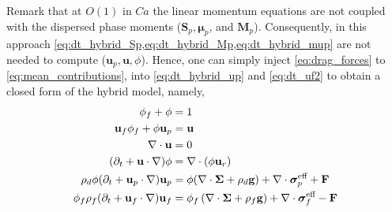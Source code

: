 Remark that at $O(1)$ in $Ca$ the linear momentum equations are not coupled with the dispersed phase moments ($\textbf{S}_p,\bm\mu_p$, and $\textbf{M}_p$).  
Consequently, in this approach \ref{eq:dt_hybrid_Sp,eq:dt_hybrid_Mp,eq:dt_hybrid_mup} are not needed to compute ($\textbf{u}_p,\textbf{u},\phi$).
Hence, one can simply inject \ref{eq:drag_forces} to \ref{eq:mean_contributions}, into  \ref{eq:dt_hybrid_up} and \ref{eq:dt_uf2} to obtain a closed form of the hybrid model, namely,  
\begin{align}
    \label{eq:firstSys}
    \phi_f + \phi &= 1\\
    \textbf{u}_f\phi_f + 
    \phi\textbf{u}_p&=\textbf{u}\\
    \div \textbf{u} &= 0\\
    (\pddt + \textbf{u} \cdot \grad)\phi
    &=
    \div (\phi \textbf{u}_r)\\
    \rho_d \phi (\pddt + \textbf{u}_p \cdot \grad)\textbf{u}_p
    &=
    \phi(\div \bm\Sigma
    + \rho_d  \textbf{g})
    + \div \bm\sigma_p^\text{eff}
    + \textbf{F}
    \\
    \phi_f \rho_f(\pddt + \textbf{u}_f  \cdot \grad) \textbf{u}_f
    &= \phi_f 
    \left(\div \bm\Sigma
    + \rho_f \textbf{g}\right)
    + \div \bm\sigma_f^\text{eff}
    -\textbf{F}
    \label{eq:lastSys}
\end{align}
